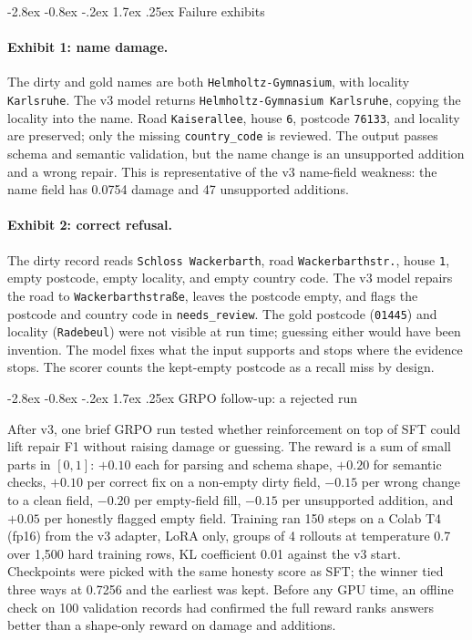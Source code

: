 \documentclass[11pt]{article}
\makeatletter
\renewcommand\section{\@startsection{section}{1}{\z@}%
  {-2.8ex \@plus -0.8ex \@minus -.2ex}%
  {1.7ex \@plus .25ex}%
  {\normalfont\Large\bfseries}}
\makeatother
\begin{document}
\section{Failure exhibits}
\label{sec:exhibits}

\paragraph{Exhibit 1: name damage.} The dirty and gold names are both
\texttt{Helmholtz-Gymnasium}, with locality \texttt{Karlsruhe}. The
v3 model returns \texttt{Helmholtz-Gymnasium Karlsruhe}, copying the
locality into the name. Road \texttt{Kaiserallee}, house \texttt{6},
postcode \texttt{76133}, and locality are preserved; only the missing
\texttt{country\_code} is reviewed. The output passes schema and
semantic validation, but the name change is an unsupported addition and
a wrong repair. This is representative of the v3 name-field weakness:
the name field has 0.0754 damage and 47 unsupported additions.

\paragraph{Exhibit 2: correct refusal.} The dirty record reads
\texttt{Schloss Wackerbarth}, road \texttt{Wackerbarthstr.}, house
\texttt{1}, empty postcode, empty locality, and empty country code.
The v3 model repairs the road to \texttt{Wackerbarthstra\ss{}e}, leaves
the postcode empty, and flags the postcode and country code in
\texttt{needs\_review}. The gold postcode (\texttt{01445}) and locality
(\texttt{Radebeul}) were not visible at run time; guessing either would
have been invention. The model fixes what the input supports and stops
where the evidence stops. The scorer counts the kept-empty postcode as
a recall miss by design.

\section{GRPO follow-up: a rejected run}
\label{sec:grpo}

After v3, one brief GRPO run tested whether reinforcement on top of SFT
could lift repair F1 without raising damage or guessing. The reward is
a sum of small parts in $[0,1]$: $+0.10$ each for parsing and schema
shape, $+0.20$ for semantic checks, $+0.10$ per correct fix on a
non-empty dirty field, $-0.15$ per wrong change to a clean field,
$-0.20$ per empty-field fill, $-0.15$ per unsupported addition, and
$+0.05$ per honestly flagged empty field. Training ran 150 steps on a
Colab T4 (fp16) from the v3 adapter, LoRA only, groups of 4 rollouts
at temperature 0.7 over 1,500 hard training rows, KL coefficient 0.01
against the v3 start. Checkpoints were picked with the same honesty
score as SFT; the winner tied three ways at 0.7256 and the earliest was
kept. Before any GPU time, an offline check on 100 validation records
had confirmed the full reward ranks answers better than a shape-only
reward on damage and additions.
\end{document}
